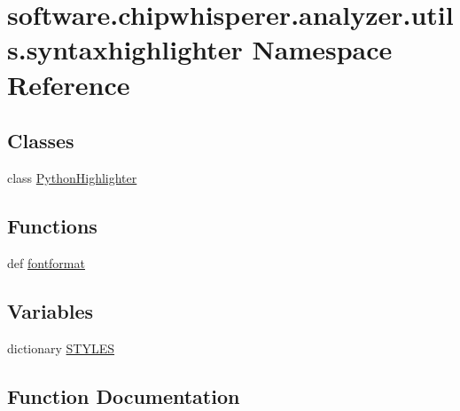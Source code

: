 \hypertarget{namespacesoftware_1_1chipwhisperer_1_1analyzer_1_1utils_1_1syntaxhighlighter}{}\section{software.\+chipwhisperer.\+analyzer.\+utils.\+syntaxhighlighter Namespace Reference}
\label{namespacesoftware_1_1chipwhisperer_1_1analyzer_1_1utils_1_1syntaxhighlighter}
\subsection*{Classes}
\begin{DoxyCompactItemize}
\item 
class \hyperlink{classsoftware_1_1chipwhisperer_1_1analyzer_1_1utils_1_1syntaxhighlighter_1_1PythonHighlighter}{Python\+Highlighter}
\end{DoxyCompactItemize}
\subsection*{Functions}
\begin{DoxyCompactItemize}
\item 
def \hyperlink{namespacesoftware_1_1chipwhisperer_1_1analyzer_1_1utils_1_1syntaxhighlighter_a4e7861054393cd43c95289be43cf111f}{fontformat}
\end{DoxyCompactItemize}
\subsection*{Variables}
\begin{DoxyCompactItemize}
\item 
dictionary \hyperlink{namespacesoftware_1_1chipwhisperer_1_1analyzer_1_1utils_1_1syntaxhighlighter_ab8e25eb52f475aa3553ecab51d52e998}{S\+T\+Y\+L\+E\+S}
\end{DoxyCompactItemize}


\subsection{Function Documentation}
\hypertarget{namespacesoftware_1_1chipwhisperer_1_1analyzer_1_1utils_1_1syntaxhighlighter_a4e7861054393cd43c95289be43cf111f}{}

